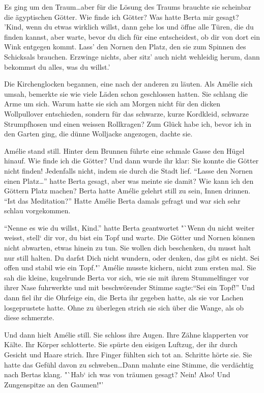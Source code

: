 \documentclass[11pt,titlepage,a5paper]{book}
\begin{document}
Es ging um den Traum\dots aber für die Lösung des Traums brauchte sie scheinbar die ägyptischen Götter. Wie finde ich Götter? Was hatte Berta mir gesagt? 'Kind, wenn du etwas wirklich willst, dann gehe los und öffne alle Türen, die du finden kannst, aber warte, bevor du dich für eine entscheidest, ob dir von dort ein Wink entgegen kommt. Lass' den Nornen den Platz, den sie zum Spinnen  des Schicksals brauchen. Erzwinge nichts, aber sitz' auch nicht wehleidig herum, dann bekommst du alles, was du willst.'

Die Kirchenglocken begannen, eine nach der anderen zu läuten. Als Amélie sich umsah, bemerkte sie wie viele Läden schon geschlossen hatten. Sie schlang die Arme um sich. Warum hatte sie sich am Morgen nicht für den dicken Wollpullover entschieden, sondern für das schwarze, kurze Kordkleid, schwarze Strumpfhosen und einen weissen Rollkragen? Zum Glück habe ich, bevor ich in den Garten ging, die dünne Wolljacke angezogen, dachte sie.
 
Amélie stand still. Hinter dem Brunnen führte eine schmale Gasse den Hügel hinauf. Wie finde ich die Götter? Und dann wurde ihr klar: Sie konnte die Götter nicht finden! Jedenfalls nicht, indem sie durch die Stadt lief. "`Lasse den Nornen einen Platz\dots"' hatte Berta gesagt, aber was meinte sie damit? Wie kann ich den Göttern Platz machen? Berta hatte Amélie gelehrt still zu sein, Innen drinnen. "`Ist das Meditation?"' Hatte Amélie Berta damals gefragt und war sich sehr schlau vorgekommen. 

"`Nenne es wie du willst, Kind."' hatte Berta geantwortet "`Wenn du nicht weiter weisst, stell` dir vor, du bist ein Topf und warte. Die Götter und Nornen können nicht abwarten, etwas hinein zu tun. Sie wollen dich beschenken, du musst halt nur still halten. Du darfst Dich nicht wundern, oder denken, das gibt es nicht. Sei offen und stabil wie ein Topf."' Amélie musste kichern, nicht zum ersten mal. Sie sah die kleine, kugelrunde Berta vor sich, wie sie mit ihrem Stummelfinger vor ihrer Nase fuhrwerkte und mit beschwörender Stimme sagte:"`Sei ein Topf!"' Und dann fiel ihr die Ohrfeige ein, die Berta ihr gegeben hatte, als sie vor Lachen losgeprustete hatte. Ohne zu überlegen strich sie sich über die Wange, als ob diese schmerzte.

Und dann hielt Amélie still. Sie schloss ihre Augen. Ihre Zähne klapperten vor Kälte. Ihr Körper schlotterte. Sie spürte den eisigen Luftzug, der ihr durch Gesicht und Haare strich. Ihre Finger fühlten sich tot an. Schritte hörte sie. Sie hatte das Gefühl davon zu schweben\dots Dann mahnte eine Stimme, die verdächtig nach Bertas klang. "`Hab` ich was von träumen gesagt? Nein! Also! Und Zungenspitze an den Gaumen!"'
\end{document}
